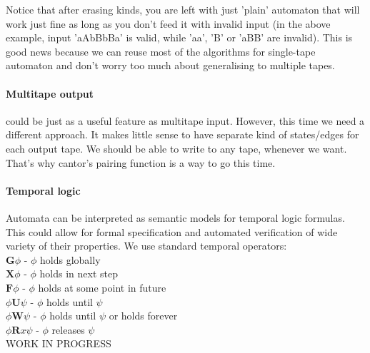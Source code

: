 \documentclass[12pt]{article}
\begin{document}
Notice that after erasing kinds, you are left with just 'plain' automaton that will work just fine as long as you don't feed it with invalid input (in the above example, input 'aAbBbBa' is valid, while  'aa', 'B' or 'aBB' are invalid). This is good news because we can reuse most of the algorithms for single-tape automaton and don't worry too much about generalising to multiple tapes. 

\paragraph{Multitape output} could be just as a useful feature as multitape input. However, this time we need a different approach. It makes little sense to have separate kind of states/edges for each output tape. We should be able to write to any tape, whenever we want. That's why cantor's pairing function is a way to go this time. 

\paragraph{Temporal logic}
Automata can be interpreted as semantic models for temporal logic formulas. This could allow for formal specification and automated verification of wide variety of their properties.  
We use standard temporal operators: \\
$\mathbf{G}\phi$ - $\phi$ holds globally \\
$\mathbf{X}\phi$ - $\phi$ holds in next step \\
$\mathbf{F}\phi$ - $\phi$ holds at some point in future \\
$\phi \mathbf{U}\psi$ - $\phi$ holds until $\psi$ \\
$\phi \mathbf{W}\psi$ - $\phi$ holds until $\psi$ or holds forever \\
$\phi \mathbf{R}x \psi$ - $\phi$ releases $\psi$ \\
WORK IN PROGRESS
\end{document}
